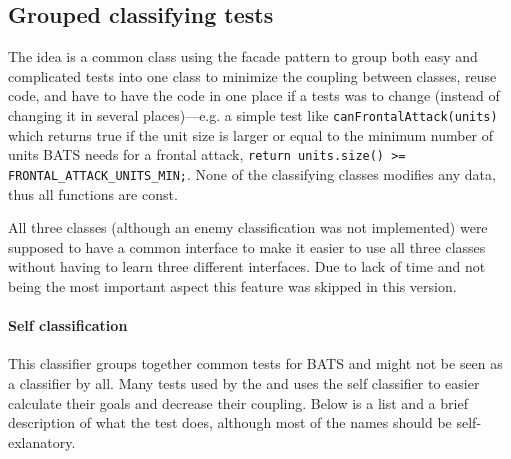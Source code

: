 \subsection{Grouped classifying tests}
The idea is a common class using the facade pattern to group both easy and complicated tests into one class to minimize the coupling between classes, reuse code, and have to have the code in one place if a tests was to change (instead of changing it in several places)—e.g. a simple test like \texttt{canFrontalAttack(units)} which returns true if the unit size is larger or equal to the minimum number of units BATS needs for a frontal attack, \texttt{\justify return units.size() >= FRONTAL\_ATTACK\_UNITS\_MIN;}. None of the classifying classes modifies any data, thus all functions are const.

All three classes (although an enemy classification was not implemented) were supposed to have a common interface to make it easier to use all three classes without having to learn three different interfaces. Due to lack of time and not being the most important aspect this feature was skipped in this version.

\paragraph{Self classification}
This classifier groups together common tests for BATS and might not be seen as a classifier by all. Many tests used by the  and  uses the self classifier to easier calculate their goals and decrease their coupling. Below is a list and a brief description of what the test does, although most of the names should be self-exlanatory.

